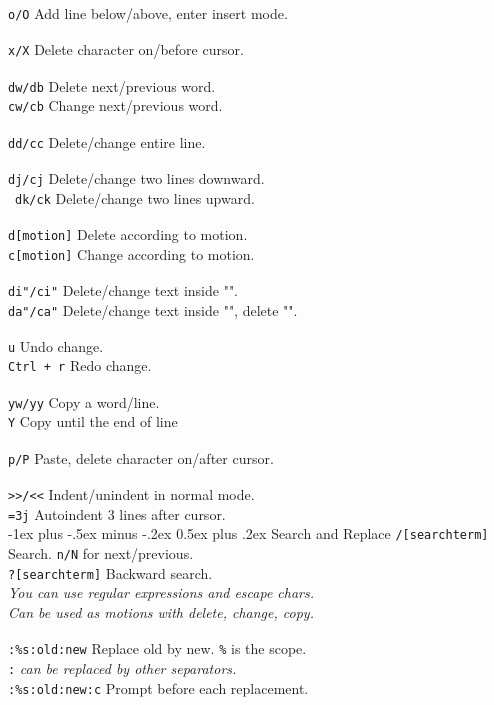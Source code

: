 \documentclass[10pt,landscape]{article}
\makeatletter
\renewcommand{\section}{\@startsection{section}{1}{0mm}%
                                {-1ex plus -.5ex minus -.2ex}%
                                {0.5ex plus .2ex}%
                                {\normalfont\large\bfseries}}
\makeatother
\begin{document}
\begin{multicols}{3}
\verb!o/O! \hfill Add line below/above, enter insert mode.\\
\verb! ! \\
\verb!x/X! \hfill Delete character on/before cursor.\\
\verb! !\\
\verb!dw/db! \hfill Delete next/previous word.\\
\verb!cw/cb! \hfill Change next/previous word.\\
\verb! !\\
\verb!dd/cc! \hfill Delete/change entire line.\\
\verb! !\\
\verb!dj/cj! \hfill Delete/change two lines downward.\\\
\verb!dk/ck! \hfill Delete/change two lines upward.\\
\verb! !\\
\verb!d[motion]! \hfill Delete according to motion.\\
\verb!c[motion]! \hfill Change according to motion.\\
\verb! !\\
\verb!di"/ci"! \hfill Delete/change text inside "".\\
\verb!da"/ca"! \hfill Delete/change text inside "", delete "".\\
\verb! ! \\
\verb!u! \hfill Undo change.\\
\verb!Ctrl + r! \hfill Redo change.\\
\verb! !\\
\verb!yw/yy! \hfill Copy a word/line.\\
\verb!Y! \hfill Copy until the end of line \\
\verb! ! \\
\verb!p/P! \hfill Paste, delete character on/after cursor.\\
\verb! !\\
\verb!>>/<<! \hfill Indent/unindent in normal mode.\\
\verb!=3j! \hfill Autoindent 3 lines after cursor.\\

\section{Search and Replace}
\verb!/[searchterm]! \hfill Search. \verb!n/N! for next/previous.\\
\verb!?[searchterm]! \hfill Backward search.\\
\textit{You can use regular expressions and escape chars.}\\
\textit{Can be used as motions with delete, change, copy.}\\
\verb! !\\
\verb!:%s:old:new! \hfill Replace old by new. \verb!%! is the scope.\\
\hfill \verb!:! \textit{can be replaced by other separators.}\\
\verb!:%s:old:new:c! \hfill Prompt before each replacement.\\


\end{multicols}
\end{document}
